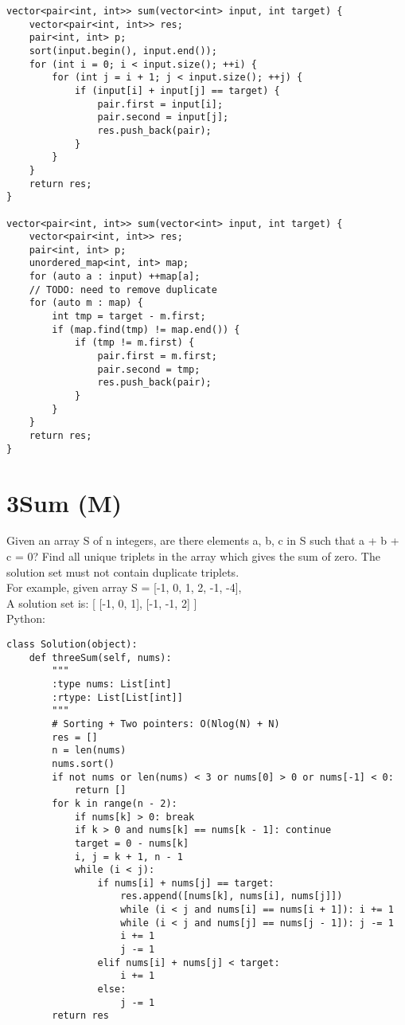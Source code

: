 \begin{lstlisting}
vector<pair<int, int>> sum(vector<int> input, int target) {
    vector<pair<int, int>> res;
    pair<int, int> p;
    sort(input.begin(), input.end());
    for (int i = 0; i < input.size(); ++i) {
        for (int j = i + 1; j < input.size(); ++j) {
            if (input[i] + input[j] == target) {
                pair.first = input[i];
                pair.second = input[j];
                res.push_back(pair);
            }
        }
    }
    return res;
}

vector<pair<int, int>> sum(vector<int> input, int target) {
    vector<pair<int, int>> res;
    pair<int, int> p;
    unordered_map<int, int> map;
    for (auto a : input) ++map[a];
    // TODO: need to remove duplicate
    for (auto m : map) {
        int tmp = target - m.first;
        if (map.find(tmp) != map.end()) {
            if (tmp != m.first) {
                pair.first = m.first;
                pair.second = tmp;
                res.push_back(pair);
            }
        }
    }
    return res;
}
\end{lstlisting}

\section{3Sum (M)}
Given an array S of n integers, are there elements a, b, c in S such that a + b + c = 0? Find all unique triplets in the array which gives the sum of zero. The solution set must not contain duplicate triplets.\\

For example, given array S = [-1, 0, 1, 2, -1, -4], \\
A solution set is:
[
  [-1, 0, 1],
  [-1, -1, 2]
] \\

Python:
\lstset{language=python}
\begin{lstlisting}
class Solution(object):
    def threeSum(self, nums):
        """
        :type nums: List[int]
        :rtype: List[List[int]]
        """
        # Sorting + Two pointers: O(Nlog(N) + N)
        res = []
        n = len(nums)
        nums.sort()
        if not nums or len(nums) < 3 or nums[0] > 0 or nums[-1] < 0: 
            return []
        for k in range(n - 2):
            if nums[k] > 0: break
            if k > 0 and nums[k] == nums[k - 1]: continue
            target = 0 - nums[k]
            i, j = k + 1, n - 1
            while (i < j):
                if nums[i] + nums[j] == target:
                    res.append([nums[k], nums[i], nums[j]])
                    while (i < j and nums[i] == nums[i + 1]): i += 1
                    while (i < j and nums[j] == nums[j - 1]): j -= 1
                    i += 1
                    j -= 1
                elif nums[i] + nums[j] < target:
                    i += 1
                else:
                    j -= 1
        return res\end{lstlisting}

